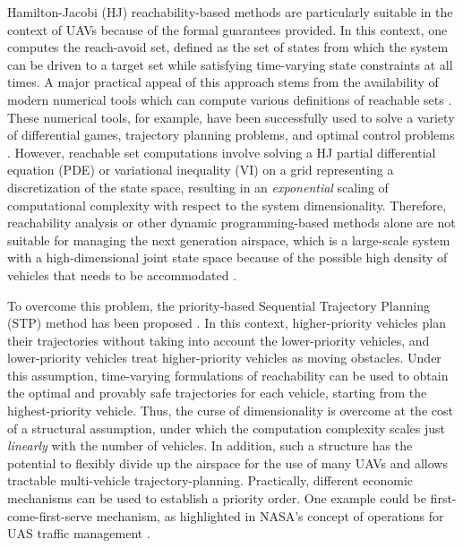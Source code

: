 Hamilton-Jacobi (HJ) reachability-based methods \cite{Barron90, Mitchell05, Bokanowski10, Bokanowski11, Margellos11, Fisac15} are particularly suitable in the context of UAVs because of the formal guarantees provided. In this context, one computes the reach-avoid set, defined as the set of states from which the system can be driven to a target set while satisfying time-varying state constraints at all times. A major practical appeal of this approach stems from the availability of modern numerical tools which can compute various definitions of reachable sets \cite{Sethian96, Osher02, Mitchell02, Mitchell07b}. These numerical tools, for example, have been successfully used to solve a variety of differential games, trajectory planning problems, and optimal control problems \cite{Bayen07, Ding08, Bouffard12, Huang11}. 
However, reachable set computations involve solving a HJ partial differential equation (PDE) or variational inequality (VI) on a grid representing a discretization of the state space, resulting in an \textit{exponential} scaling of computational complexity with respect to the system dimensionality. Therefore, reachability analysis or other dynamic programming-based methods alone are not suitable for managing the next generation airspace, which is a large-scale system with a high-dimensional joint state space because of the possible high density of vehicles that needs to be accommodated \cite{Kopardekar16}.  

To overcome this problem, the priority-based Sequential Trajectory Planning (STP) method has been proposed \cite{Chen15c, Bansal2017}. In this context, higher-priority vehicles plan their trajectories without taking into account the lower-priority vehicles, and lower-priority vehicles treat higher-priority vehicles as moving obstacles. Under this assumption, time-varying formulations of reachability \cite{Bokanowski11, Fisac15} can be used to obtain the optimal and provably safe trajectories for each vehicle, starting from the highest-priority vehicle. Thus, the curse of dimensionality is overcome at the cost of a structural assumption, under which the computation complexity scales just \textit{linearly} with the number of vehicles. In addition, such a structure has the potential to flexibly divide up the airspace for the use of many UAVs and allows tractable multi-vehicle trajectory-planning. Practically, different economic mechanisms can be used to establish a priority order. One example could be first-come-first-serve mechanism, as highlighted in NASA's concept of operations for UAS traffic management \cite{Kopardekar16}.

